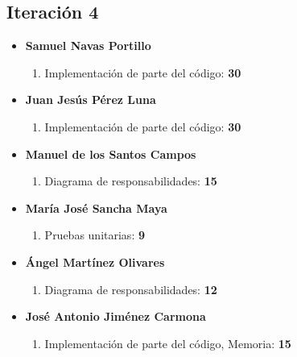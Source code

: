 \documentclass[11 pt]{book}
\begin{document}
		\subsection*{Iteración 4}
		    \begin{itemize}
			    \item \textbf {Samuel Navas Portillo}
				    \begin{enumerate}
					    \item Implementación de parte del código: \textbf{30}
				    \end{enumerate}
			    \item \textbf {Juan Jesús Pérez Luna}
				    \begin{enumerate}
					    \item Implementación de parte del código: \textbf{30}
				    \end{enumerate}
			    \item \textbf {Manuel de los Santos Campos}
				    \begin{enumerate}
					    \item Diagrama de responsabilidades: \textbf{15}
				    \end{enumerate}
			    \item \textbf {María José Sancha Maya}
				    \begin{enumerate}
					    \item Pruebas unitarias: \textbf{9}
				    \end{enumerate}
			    \item \textbf {Ángel Martínez Olivares}
				    \begin{enumerate}
					    \item Diagrama de responsabilidades: \textbf{12}
				    \end{enumerate}
			    \item \textbf {José Antonio Jiménez Carmona}
				    \begin{enumerate}
					    \item Implementación de parte del código, Memoria: \textbf{15}
				    \end{enumerate}
		    \end{itemize}
\end{document}

